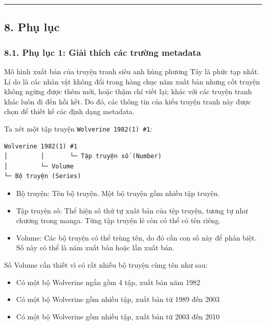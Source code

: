 \documentclass[
]{article}
\providecommand{\tightlist}{%
  \setlength{\itemsep}{0pt}\setlength{\parskip}{0pt}}
\begin{document}
\begin{center}\rule{0.5\linewidth}{0.5pt}\end{center}

\hypertarget{phux1ee5-lux1ee5c}{%
\subsection{\texorpdfstring{8. Phụ lục
}{8. Phụ lục }}\label{phux1ee5-lux1ee5c}}

\hypertarget{phux1ee5-lux1ee5c-1-giux1ea3i-thuxedch-cuxe1c-trux1b0ux1eddng-metadata}{%
\subsubsection{\texorpdfstring{8.1. Phụ lục 1: Giải thích các trường
metadata
}{8.1. Phụ lục 1: Giải thích các trường metadata }}\label{phux1ee5-lux1ee5c-1-giux1ea3i-thuxedch-cuxe1c-trux1b0ux1eddng-metadata}}

Mô hình xuất bản của truyện tranh siêu anh hùng phương Tây là phức tạp
nhất. Lí do là các nhân vật không đổi trong hàng chục năm xuất bản nhưng
cốt truyện không ngừng được thêm mới, hoặc thậm chí viết lại; khác với
các truyện tranh khác luôn đi đến hồi kết. Do đó, các thông tin của kiểu
truyện tranh này được chọn để thiết kế các định dạng metadata.

Ta xét một tập truyện \texttt{Wolverine\ 1982(1)\ \#1}:

\begin{verbatim}
Wolverine 1982(1) #1
│         │       └─ Tập truyện số (Number)
│         └─ Volume
└─ Bộ truyện (Series)
\end{verbatim}

\begin{itemize}
\tightlist
\item
  Bộ truyện: Tên bộ truyện. Một bộ truyện gồm nhiều tập truyện.
\item
  Tập truyện số: Thể hiện số thứ tự xuất bản của tệp truyện, tương tự
  như chương trong manga. Từng tập truyện lẻ còn có thể có tên riêng.
\item
  Volume: Các bộ truyện có thể trùng tên, do đó cần con số này để phân
  biệt. Số này có thể là năm xuất bản hoặc lần xuất bản.
\end{itemize}

Số Volume cần thiết vì có rất nhiều bộ truyện cùng tên như sau:

\begin{itemize}
\tightlist
\item
  Có một bộ Wolverine ngắn gồm 4 tập, xuất bản năm 1982
\item
  Có một bộ Wolverine gồm nhiều tập, xuất bản từ 1989 đến 2003
\item
  Có một bộ Wolverine gồm nhiều tập, xuất bản từ 2003 đến 2010
\end{itemize}
\end{document}
